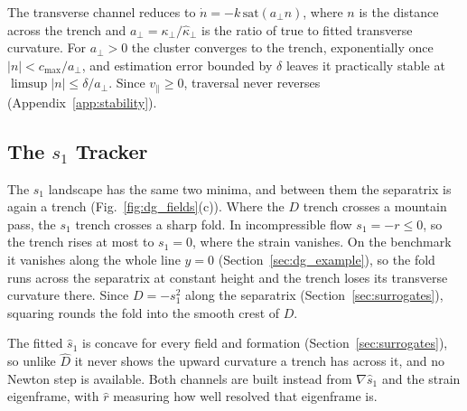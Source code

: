 \documentclass[lettersize,journal]{IEEEtran}
\begin{document}
The transverse channel reduces to $\dot{n} = -k\,\mathrm{sat}(a_\perp n)$,
where $n$ is the distance across the trench and
$a_\perp = \kappa_\perp/\hat{\kappa}_\perp$ is the ratio of true to fitted
transverse curvature. For $a_\perp > 0$ the cluster converges to the
trench, exponentially once $|n| < c_{\max}/a_\perp$, and estimation error
bounded by $\delta$ leaves it practically stable at
$\limsup |n| \leq \delta/a_\perp$. Since $v_\parallel \geq 0$, traversal
never reverses (Appendix~\ref{app:stability}).

\subsection{The $s_1$ Tracker}
\label{sec:s1_controller}

The $s_1$ landscape has the same two minima, and between them the
separatrix is again a trench (Fig.~\ref{fig:dg_fields}(c)). Where the $D$
trench crosses a mountain pass, the $s_1$ trench crosses a sharp fold. In
incompressible flow $s_1 = -r \leq 0$, so the trench rises at most to
$s_1 = 0$, where the strain vanishes. On the benchmark it vanishes along
the whole line $y = 0$ (Section~\ref{sec:dg_example}), so the fold runs
across the separatrix at constant height and the trench loses its
transverse curvature there. Since $D = -s_1^2$ along the separatrix
(Section~\ref{sec:surrogates}), squaring rounds the fold into the smooth
crest of $D$.

The fitted $\hat{s}_1$ is concave for every field and formation
(Section~\ref{sec:surrogates}), so unlike $\hat{D}$ it never shows the
upward curvature a trench has across it, and no Newton step is
available. Both channels are built instead from $\nabla\hat{s}_1$ and the
strain eigenframe, with $\hat{r}$ measuring how well resolved that
eigenframe is.
\end{document}
